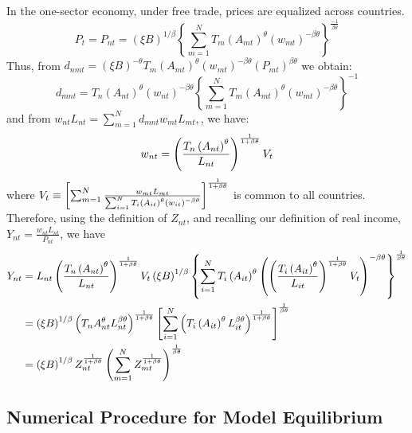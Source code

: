\documentclass[12pt]{article}
\begin{document}
In the one-sector economy, under free trade, prices are equalized across
countries. 
\begin{equation*}
P_{t}=P_{nt}=\left( \xi B\right) ^{1/\beta }\left\{
\sum_{m=1}^{N}T_{m}\left( A_{mt}\right) ^{\theta }\left( w_{mt}\right)
^{-\beta \theta }\right\} ^{\frac{-1}{\beta \theta }}
\end{equation*}%
Thus, from $d_{nmt}=\left( \xi B\right) ^{-\theta }T_{m}\left( A_{mt}\right)
^{\theta }\left( w_{mt}\right) ^{-\beta \theta }\left( P_{mt}\right) ^{\beta
\theta }$ we obtain: 
\begin{equation*}
d_{mnt}=T_{n}\left( A_{nt}\right) ^{\theta }\left( w_{nt}\right) ^{-\beta
\theta }\left\{ \sum_{m=1}^{N}T_{m}\left( A_{mt}\right) ^{\theta }\left(
w_{mt}\right) ^{-\beta \theta }\right\} ^{-1}
\end{equation*}%
and from $w_{nt}L_{nt}=\sum\nolimits_{m=1}^{N}d_{mnt}w_{mt}L_{mt},$, we
have: 
\begin{equation*}
w_{nt}=\left( \frac{T_{n}\left( A_{nt}\right) ^{\theta }}{L_{nt}}\right) ^{%
\frac{1}{1+\beta \theta }}V_{t}
\end{equation*}%
where $V_{t}\equiv \left[ \sum\nolimits_{m=1}^{N}\frac{w_{mt}L_{mt}}{%
\sum_{i=1}^{N}T_{i}\left( A_{it}\right) ^{\theta }\left( w_{it}\right)
^{-\beta \theta }}\right] ^{\frac{1}{1+\beta \theta }}$ is common to all
countries. Therefore, using the definition of $Z_{nt}$, and recalling our
definition of real income, $Y_{nt}=\frac{w_{nt}L_{nt}}{P_{nt}}$, we have%
\begin{align*}
Y_{nt}& =L_{nt}\left( \frac{T_{n}\left( A_{nt}\right) ^{\theta }}{L_{nt}}%
\right) ^{\frac{1}{1+\beta \theta }}V_{t}\left( \xi B\right) ^{1/\beta
}\left\{ \sum_{i=1}^{N}T_{i}\left( A_{it}\right) ^{\theta }\left( \left( 
\frac{T_{i}\left( A_{it}\right) ^{\theta }}{L_{it}}\right) ^{\frac{1}{%
1+\beta \theta }}V_{t}\right) ^{-\beta \theta }\right\} ^{\frac{1}{\beta
\theta }} \\
& =\left( \xi B\right) ^{1/\beta }\left( T_{n}A_{nt}^{\theta }L_{nt}^{\beta
\theta }\right) ^{\frac{1}{1+\beta \theta }}\left[ \sum_{i=1}^{N}\left(
T_{i}\left( A_{it}\right) ^{\theta }L_{it}^{\beta \theta }\right) ^{\frac{1}{%
1+\beta \theta }}\right] ^{\frac{1}{\beta \theta }} \\
& =\left( \xi B\right) ^{1/\beta }Z_{nt}^{\frac{1}{1+\beta \theta }}\left(
\sum_{m=1}^{N}Z_{mt}^{\frac{1}{1+\beta \theta }}\right) ^{\frac{1}{\beta
\theta }}
\end{align*}

\subsection*{Numerical Procedure for Model Equilibrium}
\end{document}
